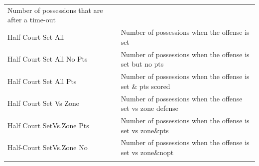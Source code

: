 \documentclass[]{book}
\begin{document}
\begin{longtable}[]{@{}ll@{}}
\begin{minipage}[t]{0.62\columnwidth}
Number of possessions that are after a time-out\strut
\end{minipage}\tabularnewline
\begin{minipage}[t]{0.32\columnwidth}\raggedright
Half Court Set All\strut
\end{minipage} & \begin{minipage}[t]{0.62\columnwidth}\raggedright
Number of possessions when the offense is set\strut
\end{minipage}\tabularnewline
\begin{minipage}[t]{0.32\columnwidth}\raggedright
Half Court Set All No Pts\strut
\end{minipage} & \begin{minipage}[t]{0.62\columnwidth}\raggedright
Number of possessions when the offense is set but no pts\strut
\end{minipage}\tabularnewline
\begin{minipage}[t]{0.32\columnwidth}\raggedright
Half Court Set All Pts\strut
\end{minipage} & \begin{minipage}[t]{0.62\columnwidth}\raggedright
Number of possessions when the offense is set \& pts scored\strut
\end{minipage}\tabularnewline
\begin{minipage}[t]{0.32\columnwidth}\raggedright
Half Court Set Vs Zone\strut
\end{minipage} & \begin{minipage}[t]{0.62\columnwidth}\raggedright
Number of possessions when the offense set vs zone defense\strut
\end{minipage}\tabularnewline
\begin{minipage}[t]{0.32\columnwidth}\raggedright
Half Court SetVs.Zone Pts\strut
\end{minipage} & \begin{minipage}[t]{0.62\columnwidth}\raggedright
Number of possessions when the offense is set vs zone\&pts\strut
\end{minipage}\tabularnewline
\begin{minipage}[t]{0.32\columnwidth}\raggedright
Half-Court SetVs.Zone No\strut
\end{minipage} & \begin{minipage}[t]{0.62\columnwidth}\raggedright
Number of possessions when the offense is set vs zone\&nopt\strut
\end{minipage}\tabularnewline
\begin{minipage}[t]{0.32\columnwidth}\raggedright

\end{minipage}
\end{longtable}
\end{document}
